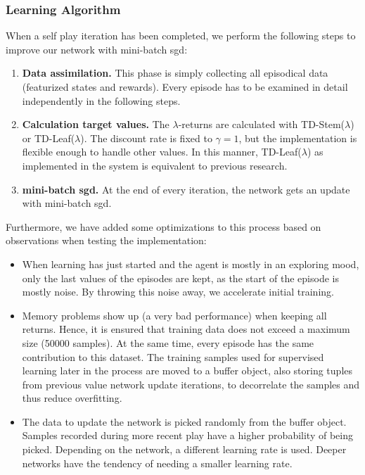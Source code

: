 \subsubsection*{Learning Algorithm}
When a self play iteration has been completed, we perform the following steps to improve our network with mini-batch \gls{sgd}:
\begin{enumerate}
\item \textbf{Data assimilation.} This phase is simply collecting all episodical data (featurized states and rewards). Every episode has to be examined in detail independently in the following steps.
\item \textbf{Calculation target values.} The $\lambda$-returns are calculated with TD-Stem($\lambda$) or TD-Leaf($\lambda$). The discount rate is fixed to $\gamma=1$, but the implementation is flexible enough to handle other values. In this manner, TD-Leaf($\lambda$) as implemented in the system is equivalent to previous research.
\item \textbf{mini-batch \gls{sgd}.} At the end of every iteration, the network gets an update with mini-batch \gls{sgd}.
\end{enumerate}

Furthermore, we have added some optimizations to this process based on observations when testing the implementation:
\begin{itemize}
\item When learning has just started and the agent is mostly in an exploring mood, only the last values of the episodes are kept, as the start of the episode is mostly noise. By throwing this noise away, we accelerate initial training.
\item Memory problems show up (a very bad performance) when keeping all returns. Hence, it is ensured that training data does not exceed a maximum size (50000 samples). At the same time, every episode has the same contribution to this dataset. The training samples used for supervised learning later in the process are moved to a buffer object, also storing tuples from previous value network update iterations, to decorrelate the samples and thus reduce overfitting.
\item The data to update the network is picked randomly from the buffer object. Samples recorded during more recent play have a higher probability of being picked. Depending on the network, a different learning rate is used. Deeper networks have the tendency of needing a smaller learning rate.
\end{itemize}


